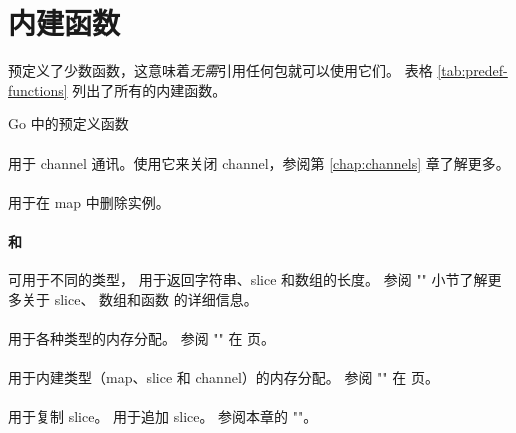 \section{内建函数}
预定义了少数函数，这意味着\emph{无需}引用任何包就可以使用它们。
表格 \ref{tab:predef-functions} 列出了所有的内建函数。

\begin{table}[H]
\begin{center}
\caption{Go 中的预定义函数}
\label{tab:predef-functions}

\end{center}
\end{table}

\paragraph{} 用于 channel
通讯。使用它来关闭 channel，参阅第 \ref{chap:channels} 章了解更多。

\paragraph{} 用于在 map 中删除实例。

\paragraph{ 和 } 可用于不同的类型，
 用于返回字符串、slice 和数组的长度。
参阅 "" 小节了解更多关于 slice、
数组和函数  的详细信息。

\paragraph{} 用于各种类型的内存分配。
参阅 "" 在 \pageref{sec:allocation with new} 页。

\paragraph{} 用于内建类型（map、slice 和 channel）的内存分配。
参阅 "" 在 \pageref{sec:allocation with make} 页。

\paragraph{} 用于复制 slice。 用于追加 slice。
参阅本章的 ""。

